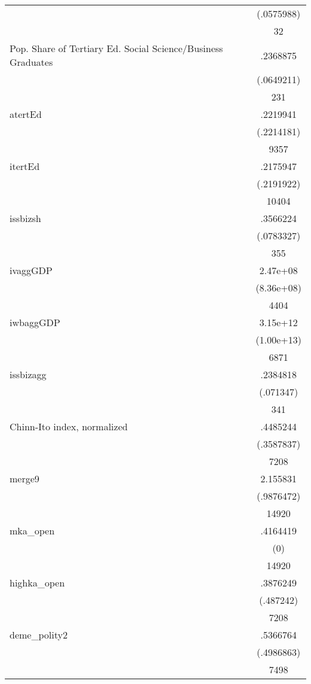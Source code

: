 {\begin{longtable}{l*{1}{c}}
                    &  (.0575988)\\
                    &          32\\
Pop. Share of Tertiary Ed. Social Science/Business Graduates&    .2368875\\
                    &  (.0649211)\\
                    &         231\\
atertEd             &    .2219941\\
                    &  (.2214181)\\
                    &        9357\\
itertEd             &    .2175947\\
                    &  (.2191922)\\
                    &       10404\\
issbizsh            &    .3566224\\
                    &  (.0783327)\\
                    &         355\\
ivaggGDP            &    2.47e+08\\
                    &  (8.36e+08)\\
                    &        4404\\
iwbaggGDP           &    3.15e+12\\
                    &  (1.00e+13)\\
                    &        6871\\
issbizagg           &    .2384818\\
                    &   (.071347)\\
                    &         341\\
Chinn-Ito index, normalized&    .4485244\\
                    &  (.3587837)\\
                    &        7208\\
merge9              &    2.155831\\
                    &  (.9876472)\\
                    &       14920\\
mka\_open            &    .4164419\\
                    &         (0)\\
                    &       14920\\
highka\_open         &    .3876249\\
                    &   (.487242)\\
                    &        7208\\
deme\_polity2        &    .5366764\\
                    &  (.4986863)\\
                    &        7498\\
\hline\hline
\end{longtable}
}
